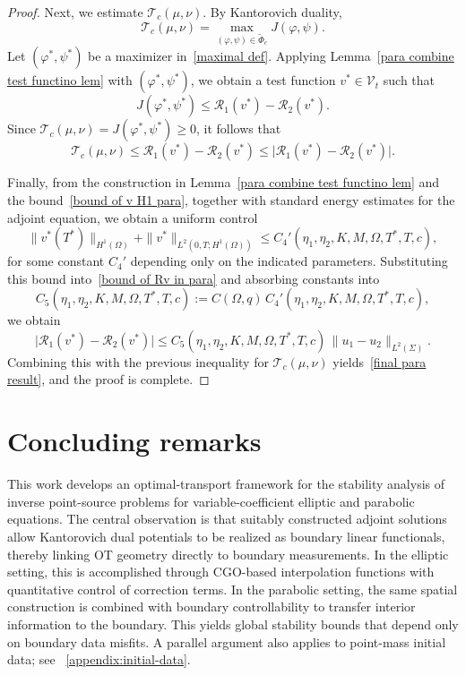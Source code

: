 \documentclass[12pt]{amsart}
\begin{document}
\begin{proof}
    Next, we estimate \(\mathcal{T}_c(\mu,\nu)\). By Kantorovich duality,
    \begin{equation}\label{maximal def}
        \mathcal{T}_c(\mu, \nu) 
        = \max_{(\varphi, \psi) \in \widetilde{\Phi}_c} J(\varphi, \psi).
    \end{equation}
    Let \((\varphi^*, \psi^*)\) be a maximizer in~\eqref{maximal def}.  
    Applying Lemma~\ref{para combine test functino lem} with \((\varphi^*,\psi^*)\), we obtain a test function \(v^*\in\mathcal{V}_t\) such that
    \begin{equation*}
        J(\varphi^*, \psi^*) \leq \mathcal{R}_1(v^*) - \mathcal{R}_2(v^*).
    \end{equation*}
    Since \(\mathcal{T}_c(\mu,\nu) = J(\varphi^*,\psi^*) \ge 0\), it follows that
    \[
    \mathcal{T}_c(\mu,\nu)
    \le \mathcal{R}_1(v^*) - \mathcal{R}_2(v^*)
    \le \big|\mathcal{R}_1(v^*) - \mathcal{R}_2(v^*)\big|.
    \]

    Finally, from the construction in Lemma~\ref{para combine test functino lem} and the bound~\eqref{bound of v H1 para}, together with standard energy estimates for the adjoint equation, we obtain a uniform control
    \[
    \|v^*(T^*)\|_{H^1(\Omega)} 
    + \|v^*\|_{L^2(0,T;H^1(\Omega))}
    \le C_4'(\eta_1,\eta_2,K,M,\Omega,T^*,T,c),
    \]
    for some constant \(C_4'\) depending only on the indicated parameters.  
    Substituting this bound into~\eqref{bound of Rv in para} and absorbing constants into
    \[
    C_5(\eta_1,\eta_2,K,M,\Omega,T^*,T,c)
    := C(\Omega,q)\,C_4'(\eta_1,\eta_2,K,M,\Omega,T^*,T,c),
    \]
    we obtain
    \[
    \big|\mathcal{R}_1(v^*) - \mathcal{R}_2(v^*)\big|
    \le C_5(\eta_1,\eta_2,K,M,\Omega,T^*,T,c)\,
        \|u_1 - u_2\|_{L^2(\Sigma)}.
    \]
    Combining this with the previous inequality for \(\mathcal{T}_c(\mu,\nu)\) yields~\eqref{final para result}, and the proof is complete.

\end{proof}



\section{Concluding remarks}

This work develops an optimal-transport framework for the stability analysis of inverse point-source problems for variable-coefficient elliptic and parabolic equations. The central observation is that suitably constructed adjoint solutions allow Kantorovich dual potentials to be realized as boundary linear functionals, thereby linking OT geometry directly to boundary measurements. In the elliptic setting, this is accomplished through CGO-based interpolation functions with quantitative control of correction terms. In the parabolic setting, the same spatial construction is combined with boundary controllability to transfer interior information to the boundary. This yields global stability bounds that depend only on boundary data misfits. A parallel argument also applies to point-mass initial data; see ~\ref{appendix:initial-data}.
\end{document}
